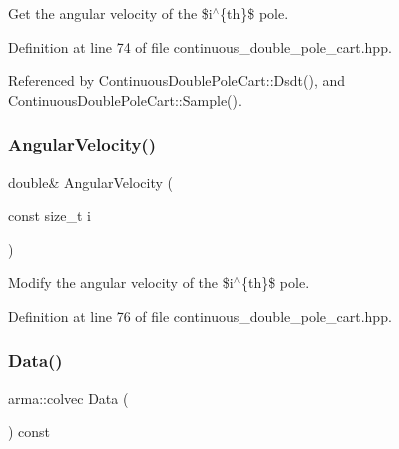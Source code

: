 Get the angular velocity of the \$i$^\wedge$\{th\}\$ pole. 



Definition at line 74 of file continuous\+\_\+double\+\_\+pole\+\_\+cart.\+hpp.



Referenced by Continuous\+Double\+Pole\+Cart\+::\+Dsdt(), and Continuous\+Double\+Pole\+Cart\+::\+Sample().

\mbox{\label{classmlpack_1_1rl_1_1ContinuousDoublePoleCart_1_1State_a340295a3f85f51b12475ae54dfae1021}} 
\subsubsection{Angular\+Velocity()\hspace{0.1cm}{\footnotesize\ttfamily [2/2]}}
{\footnotesize\ttfamily double\& Angular\+Velocity (\begin{DoxyParamCaption}\item[{const size\+\_\+t}]{i }\end{DoxyParamCaption})\hspace{0.3cm}{\ttfamily [inline]}}



Modify the angular velocity of the \$i$^\wedge$\{th\}\$ pole. 



Definition at line 76 of file continuous\+\_\+double\+\_\+pole\+\_\+cart.\+hpp.

\mbox{\label{classmlpack_1_1rl_1_1ContinuousDoublePoleCart_1_1State_a3824537c629944975541602c7119a3d9}} 
\subsubsection{Data()\hspace{0.1cm}{\footnotesize\ttfamily [1/2]}}
{\footnotesize\ttfamily arma\+::colvec Data (\begin{DoxyParamCaption}{ }\end{DoxyParamCaption}) const\hspace{0.3cm}{\ttfamily [inline]}}



